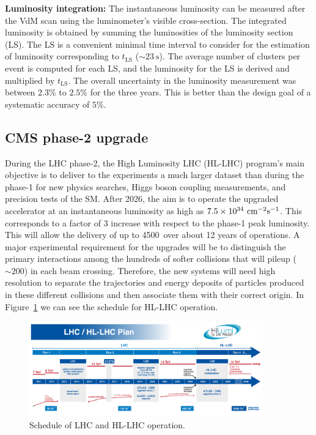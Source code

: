 \textbf{Luminosity integration:} The instantaneous luminosity can be measured after the VdM scan using the luminometer's visible cross-section. The integrated luminosity is obtained by summing the luminosities of the luminosity section (LS). The LS is a convenient minimal time interval to consider for the estimation of luminosity corresponding to $t_{\text{LS}}$ ($\sim 23~\text{s}$). The average number of clusters per event is computed for each LS, and the luminosity for the LS is derived and multiplied by $t_{\text{LS}}$. The overall uncertainty in the luminosity measurement was between $2.3\%$ to $2.5\%$ for the three years. This is better than the design goal of a systematic accuracy of $5\%$.

\subsection{CMS phase-2 upgrade}

During the LHC phase-2, the High Luminosity LHC (HL-LHC) program's main objective is to deliver to the experiments a much larger dataset than during the phase-1 for new physics searches, Higgs boson coupling measurements, and precision tests of the SM. After 2026, the aim is to operate the upgraded accelerator at an instantaneous luminosity as high as $7.5 \times 10^{34}~\text{cm}^{-2}\text{s}^{-1}$. This corresponds to a factor of 3 increase with respect to the phase-1 peak luminosity. This will allow the delivery of up to 4500~\fb over about 12 years of operations. A major experimental requirement for the upgrades will be to distinguish the primary interactions among the hundreds of softer collisions that will pileup ($\sim 200$) in each beam crossing. Therefore, the new systems will need high resolution to separate the trajectories and energy deposits of particles produced in these different collisions and then associate them with their correct origin. In Figure~\ref{fig:HLLHC} we can see the schedule for HL-LHC operation.

\begin{figure}[htbp]
  \centering
  \includegraphics[width=0.9\textwidth]{plots/chapter3/HLLHC.png}
  \caption{Schedule of LHC and HL-LHC operation.}
  \label{fig:HLLHC}
\end{figure}

